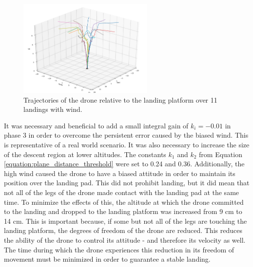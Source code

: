 \begin{figure}[ht]
    \centering
    \includegraphics[width=0.6\textwidth]{images/randial_land_testing_wind.png}
    \caption{Trajectories of the drone relative to the landing platform over 11 landings with wind.}
    \label{fig:radial_landings_wind}
\end{figure}

It was necessary and beneficial to add a small integral gain of $k_i=-0.01$ in phase 3 in order to overcome the persistent error caused by the biased wind. This is representative of a real world scenario. It was also necessary to increase the size of the descent region at lower altitudes. The constants $k_1$ and $k_2$ from Equation \ref{equation:plane_distance_threshold} were set to 0.24 and 0.36. Additionally, the high wind caused the drone to have a biased attitude in order to maintain its position over the landing pad. This did not prohibit landing, but it did mean that not all of the legs of the drone made contact with the landing pad at the same time. To minimize the effects of this, the altitude at which the drone committed to the landing and dropped to the landing platform was increased from 9 cm to 14 cm. This is important because, if some but not all of the legs are touching the landing platform, the degrees of freedom of the drone are reduced. This reduces the ability of the drone to control its attitude - and therefore its velocity as well. The time during which the drone experiences this reduction in its freedom of movement must be minimized in order to guarantee a stable landing.
